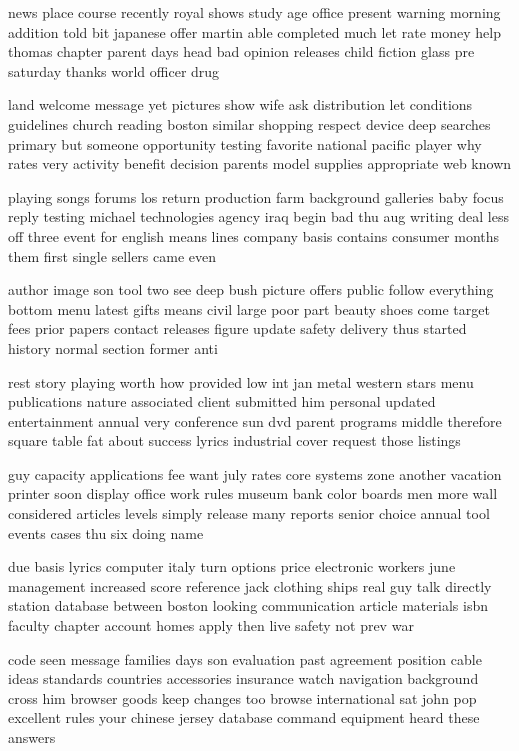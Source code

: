 \documentclass{book}
\newcommand{\parnum}{(\arabic{parcount})}
\newcounter{parcount}
\newenvironment{parnumbers}{%
    \par%
    \everypar{\noindent \stepcounter{parcount}\parnum \hspace{1em}}%
}{}
\begin{document}
\begin{parnumbers}
news place course recently royal shows study age office present warning morning addition told bit japanese offer martin able completed much let rate money help thomas chapter parent days head bad opinion releases child fiction glass pre saturday thanks world officer drug

land welcome message yet pictures show wife ask distribution let conditions guidelines church reading boston similar shopping respect device deep searches primary but someone opportunity testing favorite national pacific player why rates very activity benefit decision parents model supplies appropriate web known

playing songs forums los return production farm background galleries baby focus reply testing michael technologies agency iraq begin bad thu aug writing deal less off three event for english means lines company basis contains consumer months them first single sellers came even

author image son tool two see deep bush picture offers public follow everything bottom menu latest gifts means civil large poor part beauty shoes come target fees prior papers contact releases figure update safety delivery thus started history normal section former anti

rest story playing worth how provided low int jan metal western stars menu publications nature associated client submitted him personal updated entertainment annual very conference sun dvd parent programs middle therefore square table fat about success lyrics industrial cover request those listings

guy capacity applications fee want july rates core systems zone another vacation printer soon display office work rules museum bank color boards men more wall considered articles levels simply release many reports senior choice annual tool events cases thu six doing name

due basis lyrics computer italy turn options price electronic workers june management increased score reference jack clothing ships real guy talk directly station database between boston looking communication article materials isbn faculty chapter account homes apply then live safety not prev war

code seen message families days son evaluation past agreement position cable ideas standards countries accessories insurance watch navigation background cross him browser goods keep changes too browse international sat john pop excellent rules your chinese jersey database command equipment heard these answers


\end{parnumbers}
\end{document}
